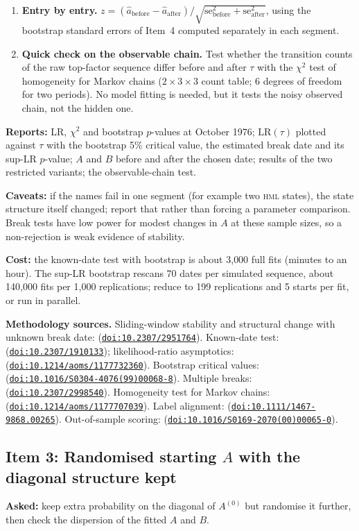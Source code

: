 \documentclass[11pt]{article}
\newcommand{\HML}{\textsc{hml}}
\newcommand{\doi}[1]{\href{https://doi.org/#1}{\nolinkurl{doi:#1}}}
\begin{document}
\begin{enumerate}
\item \textbf{Entry by entry.} $z=(\hat a_{\text{before}}-\hat a_{\text{after}})/\sqrt{\text{se}_{\text{before}}^2+\text{se}_{\text{after}}^2}$, using the bootstrap standard errors of Item~4 computed separately in each segment.
\item \textbf{Quick check on the observable chain.} Test whether the transition counts of the raw top-factor sequence differ before and after $\tau$ with the $\chi^2$ test of homogeneity for Markov chains \citep{anderson1957} ($2\times3\times3$ count table; 6 degrees of freedom for two periods). No model fitting is needed, but it tests the noisy observed chain, not the hidden one.
\end{enumerate}
\textbf{Reports:} LR, $\chi^2$ and bootstrap $p$-values at October 1976; $\text{LR}(\tau)$ plotted against $\tau$ with the bootstrap 5\% critical value, the estimated break date and its sup-LR $p$-value; $A$ and $B$ before and after the chosen date; results of the two restricted variants; the observable-chain test.

\textbf{Caveats:} if the names fail in one segment (for example two \HML{} states), the state structure itself changed; report that rather than forcing a parameter comparison. Break tests have low power for modest changes in $A$ at these sample sizes, so a non-rejection is weak evidence of stability.

\textbf{Cost:} the known-date test with bootstrap is about 3{,}000 full fits (minutes to an hour). The sup-LR bootstrap rescans 70 dates per simulated sequence, about 140{,}000 fits per 1{,}000 replications; reduce to 199 replications and 5 starts per fit, or run in parallel.

\textbf{Methodology sources.} Sliding-window stability and structural change with unknown break date: \citet{andrews1993} (\doi{10.2307/2951764}). Known-date test: \citet{chow1960} (\doi{10.2307/1910133}); likelihood-ratio asymptotics: \citet{wilks1938} (\doi{10.1214/aoms/1177732360}). Bootstrap critical values: \citet{hansen2000} (\doi{10.1016/S0304-4076(99)00068-8}). Multiple breaks: \citet{baiperron1998} (\doi{10.2307/2998540}). Homogeneity test for Markov chains: \citet{anderson1957} (\doi{10.1214/aoms/1177707039}). Label alignment: \citet{stephens2000} (\doi{10.1111/1467-9868.00265}). Out-of-sample scoring: \citet{tashman2000} (\doi{10.1016/S0169-2070(00)00065-0}).

\subsection{Item 3: Randomised starting $A$ with the diagonal structure kept}
\textbf{Asked:} keep extra probability on the diagonal of $A^{(0)}$ but randomise it further, then check the dispersion of the fitted $A$ and $B$.
\end{document}

